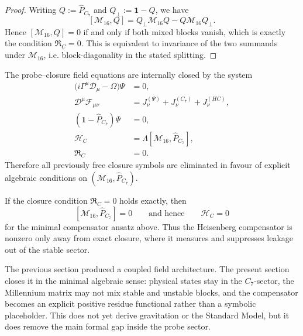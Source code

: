 \begin{proof}
Writing $Q:=\hat P_{C_7}$ and $Q_\perp:=\mathbf 1-Q$, we have
\[
  [\mathcal M_{16},Q]
  =
  Q_\perp\mathcal M_{16}Q - Q\mathcal M_{16}Q_\perp.
\]
Hence $[\mathcal M_{16},Q]=0$ if and only if both mixed blocks vanish,
which is exactly the condition $\mathfrak R_C=0$.
This is equivalent to invariance of the two summands under
$\mathcal M_{16}$, i.e. block-diagonality in the stated splitting.
\end{proof}

\begin{theorem}
\label{thm:closed-master-system}
The probe--closure field equations are internally closed by the system
\begin{align*}
  \bigl(i\Gamma^\mu\mathcal D_\mu - \Omega\bigr)\Psi &= 0,\\
  \mathcal D^\mu\mathcal F_{\mu\nu}
    &= J^{(\Psi)}_\nu + J^{(C_7)}_\nu + J^{(HC)}_\nu,\\
  (\mathbf 1-\hat P_{C_7})\Psi &= 0,\\
  \mathcal H_C &= \Lambda[\mathcal M_{16},\hat P_{C_7}],\\
  \mathfrak R_C &= 0.
\end{align*}
Therefore all previously free closure symbols are eliminated in favour
of explicit algebraic conditions on $(\mathcal M_{16},\hat P_{C_7})$.
\end{theorem}

\begin{corollary}
If the closure condition $\mathfrak R_C=0$ holds exactly, then
\[
  [\mathcal M_{16},\hat P_{C_7}] = 0
  \qquad\text{and hence}\qquad
  \mathcal H_C = 0
\]
for the minimal compensator ansatz above.
Thus the Heisenberg compensator is nonzero only away from exact closure,
where it measures and suppresses leakage out of the stable sector.
\end{corollary}

\begin{remark}
The previous section produced a coupled field architecture.
The present section closes it in the minimal algebraic sense:
physical states stay in the $C_7$-sector, the Millennium matrix may not
mix stable and unstable blocks, and the compensator becomes an explicit
positive residue functional rather than a symbolic placeholder.
This does not yet derive gravitation or the Standard Model, but it does
remove the main formal gap inside the probe sector.
\end{remark}

